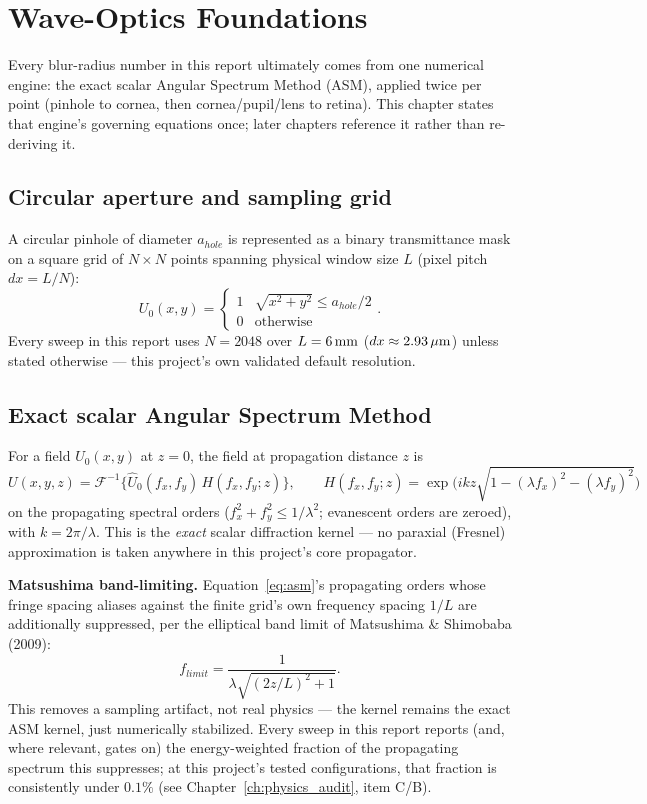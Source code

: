 \chapter{Wave-Optics Foundations}
\label{ch:wave_optics}

Every blur-radius number in this report ultimately comes from one numerical engine:
the exact scalar Angular Spectrum Method (ASM), applied twice per point (pinhole to
cornea, then cornea/pupil/lens to retina). This chapter states that engine's governing
equations once; later chapters reference it rather than re-deriving it.

\section{Circular aperture and sampling grid}

A circular pinhole of diameter $a_{hole}$ is represented as a binary transmittance
mask on a square grid of $N\times N$ points spanning physical window size $L$ (pixel
pitch $dx=L/N$):
\begin{equation}
U_0(x,y) = \begin{cases} 1 & \sqrt{x^2+y^2} \le a_{hole}/2 \\ 0 & \text{otherwise} \end{cases}.
\end{equation}
Every sweep in this report uses $N=2048$ over $L=6\,\text{mm}$ ($dx\approx2.93\,\mu\text{m}$) unless
stated otherwise --- this project's own validated default resolution.

\section{Exact scalar Angular Spectrum Method}

For a field $U_0(x,y)$ at $z=0$, the field at propagation distance $z$ is
\begin{equation}
U(x,y,z) = \mathcal{F}^{-1}\Big\{ \hat U_0(f_x,f_y)\, H(f_x,f_y;z) \Big\}, \qquad
H(f_x,f_y;z) = \exp\!\Big(i k z \sqrt{1-(\lambda f_x)^2-(\lambda f_y)^2}\Big)
\label{eq:asm}
\end{equation}
on the propagating spectral orders ($f_x^2+f_y^2 \le 1/\lambda^2$; evanescent orders
are zeroed), with $k=2\pi/\lambda$. This is the \emph{exact} scalar diffraction
kernel --- no paraxial (Fresnel) approximation is taken anywhere in this project's core
propagator.

\textbf{Matsushima band-limiting.} Equation~\eqref{eq:asm}'s propagating orders whose
fringe spacing aliases against the finite grid's own frequency spacing $1/L$ are
additionally suppressed, per the elliptical band limit of Matsushima \& Shimobaba
(2009):
\begin{equation}
f_{limit} = \frac{1}{\lambda\sqrt{(2z/L)^2+1}}.
\end{equation}
This removes a sampling artifact, not real physics --- the kernel remains the exact ASM
kernel, just numerically stabilized. Every sweep in this report reports (and, where
relevant, gates on) the energy-weighted fraction of the propagating spectrum this
suppresses; at this project's tested configurations, that fraction is consistently
under $0.1\%$ (see Chapter~\ref{ch:physics_audit}, item C/B).


